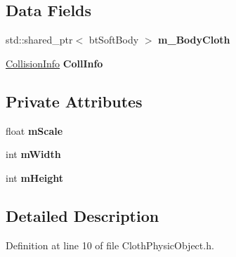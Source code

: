 \subsection*{Data Fields}
\begin{DoxyCompactItemize}
\item 
std\+::shared\+\_\+ptr$<$ bt\+Soft\+Body $>$ {\bfseries m\+\_\+\+Body\+Cloth}\hypertarget{class_physics_1_1_cloth_physic_object_afc314d3b98724e0df6179b937595db22}{}\label{class_physics_1_1_cloth_physic_object_afc314d3b98724e0df6179b937595db22}

\item 
\hyperlink{class_physics_1_1_collision_info}{Collision\+Info} {\bfseries Coll\+Info}\hypertarget{class_physics_1_1_cloth_physic_object_a7fe0ba698cd4bcb4d82a25cb7e0e5aa2}{}\label{class_physics_1_1_cloth_physic_object_a7fe0ba698cd4bcb4d82a25cb7e0e5aa2}

\end{DoxyCompactItemize}
\subsection*{Private Attributes}
\begin{DoxyCompactItemize}
\item 
float {\bfseries m\+Scale}\hypertarget{class_physics_1_1_cloth_physic_object_ad9c5b1da6495f984ee0215d296677456}{}\label{class_physics_1_1_cloth_physic_object_ad9c5b1da6495f984ee0215d296677456}

\item 
int {\bfseries m\+Width}\hypertarget{class_physics_1_1_cloth_physic_object_aeab1e545b898d75f7f1b4b0bac94399a}{}\label{class_physics_1_1_cloth_physic_object_aeab1e545b898d75f7f1b4b0bac94399a}

\item 
int {\bfseries m\+Height}\hypertarget{class_physics_1_1_cloth_physic_object_a1e42276fd67a31e4cf892181382e9e64}{}\label{class_physics_1_1_cloth_physic_object_a1e42276fd67a31e4cf892181382e9e64}

\end{DoxyCompactItemize}


\subsection{Detailed Description}


Definition at line 10 of file Cloth\+Physic\+Object.\+h.

